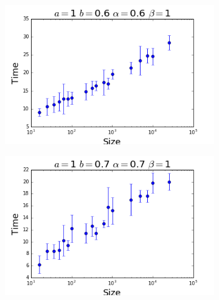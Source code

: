\begin{figure}[h]
  \centering
  \begin{subfigure}[b]{0.4\linewidth}
    \includegraphics[width=\linewidth]{images/appendix/bestfit/confirm3.png}
  \end{subfigure}
  \begin{subfigure}[b]{0.4\linewidth}
    \includegraphics[width=\linewidth]{images/appendix/bestfit/confirm4.png}
  \end{subfigure}
\end{figure}

